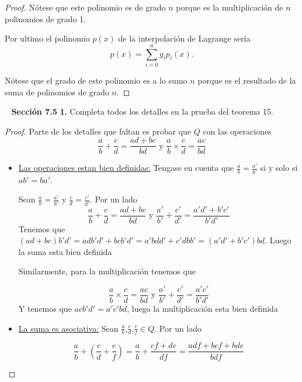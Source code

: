 \documentclass[letter,twoside,12pt]{article}
\begin{document}
\begin{enumerate}[label=\textbf{(\alph*)}]
\begin{proof}
N\'otese que este polinomio es de grado $n$ porque es la multiplicaci\'on de $n$ polinomios de grado 1.

Por ultimo el polinomio $p(x)$ de la interpolaci\'on de Lagrange ser\'ia
\begin{equation}
p(x)=\sum_{i=0}^{n}y_ip_i(x) \nonumber.
\end{equation}

N\'otese que el grado de este polinomio es a lo sumo $n$ porque es el resultado de la suma de polinomios de grado $n$.
\end{proof}
\end{enumerate}

\newpage
\mbox{ }
\newpage
\textbf{Secci\'on 7.5} \textbf{1.} Completa todos los detalles en la prueba del teorema 15.
\begin{proof}
Parte de los detalles que faltan es probar que $Q$ con las operaciones
\begin{equation}
\frac{a}{b}+\frac{c}{d}=\frac{ad+bc}{bd} \text{ y } \frac{a}{b} \times \frac{c}{d}=\frac{ac}{bd} \nonumber
\end{equation}

\begin{itemize}
\item \underline{Las operaciones estan bien definidas:} Tengase en cuenta que $\frac{a}{b} = \frac{a'}{b'}$ si y solo si $ab'=ba'$.

Sean $\frac{a}{b} = \frac{a'}{b'}$ y $\frac{c}{d} = \frac{c'}{d'}$. Por un lado
\begin{equation}
\frac{a}{b}+\frac{c}{d}=\frac{ad+bc}{bd}  \text{ y }\frac{a'}{b'}+\frac{c'}{d'}=\frac{a'd'+b'c'}{b'd'} \nonumber
\end{equation} 
Tenemos que $ (ad+bc)b'd'=adb'd'+bcb'd'=a'bdd'+c'dbb'=(a'd'+b'c')bd $. Luego la suma esta bien definida

Similarmente, para la multiplicaci\'on tenemos que

\begin{equation}
\frac{a}{b} \times \frac{c}{d}=\frac{ac}{bd}  \text{ y }\frac{a'}{b'}+\frac{c'}{d'}=\frac{a'c'}{b'd'} \nonumber
\end{equation} 
Y tenemos que $acb'd'=a'c'bd$, luego la multiplicaci\'on esta bien definida
\item \underline{La suma es asociativa:} Sean $ \frac{a}{b} $,$ \frac{c}{d} $,$ \frac{e}{f} \in Q$. Por un lado

\begin{equation}
\frac{a}{b}+(\frac{c}{d}+\frac{e}{f})=\frac{a}{b}+\frac{cf+de}{df}=\frac{adf+bcf+bde}{bdf} \nonumber
\end{equation}


\end{itemize}
\end{proof}
\end{document}
